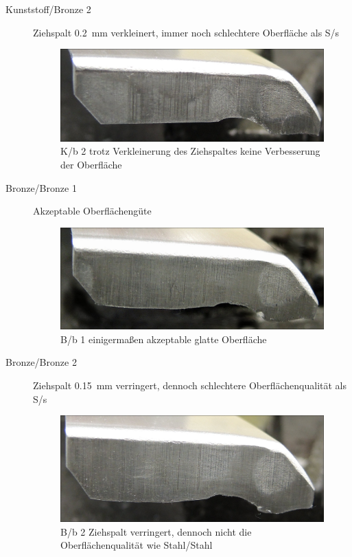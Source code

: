 \documentclass[12pt,a4paper,parskip,twoside,BCOR5mm,headsepline]{scrartcl}
\begin{document}
\begin{description*}
\begin{description}
\item[Kunststoff/Bronze 2] Ziehspalt \SI{0.2}{\milli\meter} verkleinert, immer noch schlechtere Oberfläche als S/s
\begin{figure}[H]
\centering
\includegraphics[width=.8\textwidth]{Kb2}
\caption{K/b 2 trotz Verkleinerung des Ziehspaltes keine Verbesserung der Oberfläche}
\label{fig:Kb2}
\end{figure}
\newpage

\item[Bronze/Bronze 1] Akzeptable Oberflächengüte
\begin{figure}[H]
\centering
\includegraphics[width=.8\textwidth]{Bb1}
\caption{B/b 1 einigermaßen akzeptable glatte Oberfläche}
\label{fig:Bb1}
\end{figure}

\item[Bronze/Bronze 2] Ziehspalt \SI{0.15}{\milli\meter} verringert,  dennoch schlechtere Oberflächenqualität als S/s
\begin{figure}[H]
\centering
\includegraphics[width=.8\textwidth]{Bb2}
\caption{B/b 2 Ziehspalt verringert, dennoch nicht die Oberflächenqualität wie Stahl/Stahl}
\label{fig:Bb2}
\end{figure}
\newpage


\end{description}
\end{description*}
\end{document}

